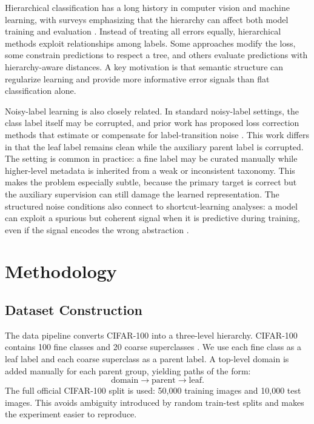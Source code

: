 \documentclass[runningheads]{llncs}
\begin{document}
Hierarchical classification has a long history in computer vision and machine
learning, with surveys emphasizing that the hierarchy can affect both model
training and evaluation \cite{silla2011survey}. Instead of treating all errors
equally, hierarchical methods exploit relationships among labels. Some
approaches modify the loss, some constrain predictions to respect a tree, and
others evaluate predictions with hierarchy-aware distances. A key motivation
is that semantic structure can regularize learning and provide more informative
error signals than flat classification alone.

Noisy-label learning is also closely related. In standard noisy-label settings,
the class label itself may be corrupted, and prior work has proposed loss
correction methods that estimate or compensate for label-transition noise
\cite{patrini2017noise}. This work differs in that the leaf label remains
clean while the auxiliary parent label is corrupted. The setting is common in
practice: a fine label may be curated manually while higher-level metadata is
inherited from a weak or inconsistent taxonomy. This makes the problem
especially subtle, because the primary target is correct but the auxiliary
supervision can still damage the learned representation. The structured noise
conditions also connect to shortcut-learning analyses: a model can exploit a
spurious but coherent signal when it is predictive during training, even if the
signal encodes the wrong abstraction \cite{geirhos2020shortcut}.

\section{Methodology}
\subsection{Dataset Construction}
The data pipeline converts CIFAR-100 into a three-level hierarchy. CIFAR-100
contains 100 fine classes and 20 coarse superclasses \cite{krizhevsky2009learning}.
We use each fine class as a leaf label and each coarse superclass as a parent
label. A top-level domain is added manually for each parent group, yielding
paths of the form:
\begin{equation}
\mathrm{domain} \rightarrow \mathrm{parent} \rightarrow \mathrm{leaf}.
\end{equation}
The full official CIFAR-100 split is used: 50,000 training images and 10,000
test images. This avoids ambiguity introduced by random train-test splits and
makes the experiment easier to reproduce.
\end{document}
